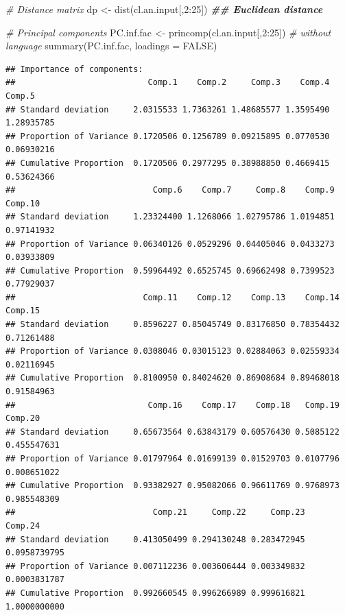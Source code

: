 \documentclass[
]{article}
\newenvironment{Shaded}{\begin{snugshade}}{\end{snugshade}}
\newcommand{\AttributeTok}[1]{\textcolor[rgb]{0.77,0.63,0.00}{#1}}
\newcommand{\CommentTok}[1]{\textcolor[rgb]{0.56,0.35,0.01}{\textit{#1}}}
\newcommand{\ConstantTok}[1]{\textcolor[rgb]{0.00,0.00,0.00}{#1}}
\newcommand{\DecValTok}[1]{\textcolor[rgb]{0.00,0.00,0.81}{#1}}
\newcommand{\DocumentationTok}[1]{\textcolor[rgb]{0.56,0.35,0.01}{\textbf{\textit{#1}}}}
\newcommand{\FunctionTok}[1]{\textcolor[rgb]{0.00,0.00,0.00}{#1}}
\newcommand{\NormalTok}[1]{#1}
\newcommand{\OtherTok}[1]{\textcolor[rgb]{0.56,0.35,0.01}{#1}}
\newcommand{\SpecialCharTok}[1]{\textcolor[rgb]{0.00,0.00,0.00}{#1}}
\begin{document}
\begin{Shaded}
\begin{Highlighting}[]
\CommentTok{\# Distance matrix}
\NormalTok{dp }\OtherTok{\textless{}{-}} \FunctionTok{dist}\NormalTok{(cl.an.input[,}\DecValTok{2}\SpecialCharTok{:}\DecValTok{25}\NormalTok{]) }\DocumentationTok{\#\# Euclidean distance}

\CommentTok{\# Principal components}
\NormalTok{PC.inf.fac }\OtherTok{\textless{}{-}} \FunctionTok{princomp}\NormalTok{(cl.an.input[,}\DecValTok{2}\SpecialCharTok{:}\DecValTok{25}\NormalTok{]) }\CommentTok{\# without language}
\FunctionTok{summary}\NormalTok{(PC.inf.fac, }\AttributeTok{loadings =} \ConstantTok{FALSE}\NormalTok{) }
\end{Highlighting}
\end{Shaded}

\begin{verbatim}
## Importance of components:
##                           Comp.1    Comp.2     Comp.3    Comp.4     Comp.5
## Standard deviation     2.0315533 1.7363261 1.48685577 1.3595490 1.28935785
## Proportion of Variance 0.1720506 0.1256789 0.09215895 0.0770530 0.06930216
## Cumulative Proportion  0.1720506 0.2977295 0.38988850 0.4669415 0.53624366
##                            Comp.6    Comp.7     Comp.8    Comp.9    Comp.10
## Standard deviation     1.23324400 1.1268066 1.02795786 1.0194851 0.97141932
## Proportion of Variance 0.06340126 0.0529296 0.04405046 0.0433273 0.03933809
## Cumulative Proportion  0.59964492 0.6525745 0.69662498 0.7399523 0.77929037
##                          Comp.11    Comp.12    Comp.13    Comp.14    Comp.15
## Standard deviation     0.8596227 0.85045749 0.83176850 0.78354432 0.71261488
## Proportion of Variance 0.0308046 0.03015123 0.02884063 0.02559334 0.02116945
## Cumulative Proportion  0.8100950 0.84024620 0.86908684 0.89468018 0.91584963
##                           Comp.16    Comp.17    Comp.18   Comp.19     Comp.20
## Standard deviation     0.65673564 0.63843179 0.60576430 0.5085122 0.455547631
## Proportion of Variance 0.01797964 0.01699139 0.01529703 0.0107796 0.008651022
## Cumulative Proportion  0.93382927 0.95082066 0.96611769 0.9768973 0.985548309
##                            Comp.21     Comp.22     Comp.23      Comp.24
## Standard deviation     0.413050499 0.294130248 0.283472945 0.0958739795
## Proportion of Variance 0.007112236 0.003606444 0.003349832 0.0003831787
## Cumulative Proportion  0.992660545 0.996266989 0.999616821 1.0000000000
\end{verbatim}
\end{document}
